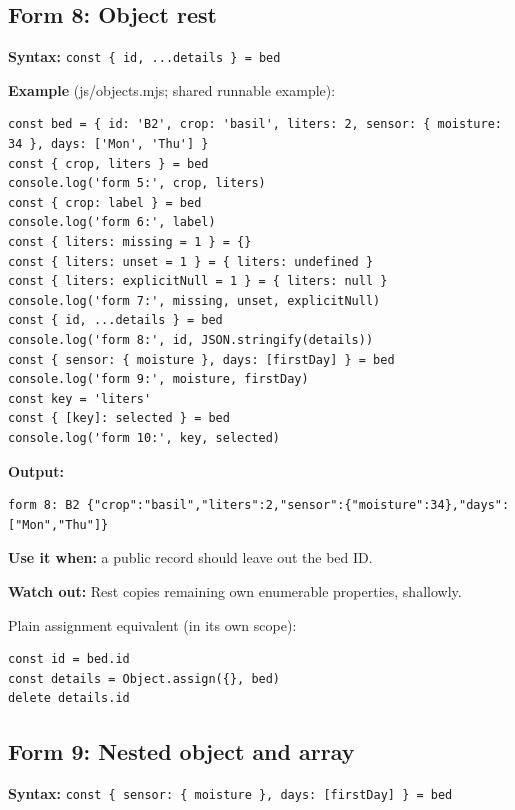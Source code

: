 \documentclass[
  10pt,
  a4paper,
]{article}
\begin{document}
\subsection{Form 8: Object rest}\label{form-8-object-rest}

\textbf{Syntax:}
\texttt{const \{ id,\allowbreak{} .\allowbreak{}.\allowbreak{}.\allowbreak{}details \} =\allowbreak{} bed}

\textbf{Example} (js/objects.mjs; shared runnable example):

\begin{lstlisting}
const bed = { id: 'B2', crop: 'basil', liters: 2, sensor: { moisture: 34 }, days: ['Mon', 'Thu'] }
const { crop, liters } = bed
console.log('form 5:', crop, liters)
const { crop: label } = bed
console.log('form 6:', label)
const { liters: missing = 1 } = {}
const { liters: unset = 1 } = { liters: undefined }
const { liters: explicitNull = 1 } = { liters: null }
console.log('form 7:', missing, unset, explicitNull)
const { id, ...details } = bed
console.log('form 8:', id, JSON.stringify(details))
const { sensor: { moisture }, days: [firstDay] } = bed
console.log('form 9:', moisture, firstDay)
const key = 'liters'
const { [key]: selected } = bed
console.log('form 10:', key, selected)
\end{lstlisting}

\textbf{Output:}

\begin{lstlisting}
form 8: B2 {"crop":"basil","liters":2,"sensor":{"moisture":34},"days":["Mon","Thu"]}
\end{lstlisting}

\textbf{Use it when:} a public record should leave out the bed ID.

\textbf{Watch out:} Rest copies remaining own enumerable properties,
shallowly.

Plain assignment equivalent (in its own scope):

\begin{lstlisting}
const id = bed.id
const details = Object.assign({}, bed)
delete details.id
\end{lstlisting}

\subsection{Form 9: Nested object and
array}\label{form-9-nested-object-and-array}

\textbf{Syntax:}
\texttt{const \{ sensor:\allowbreak{} \{ moisture \},\allowbreak{} days:\allowbreak{} [firstDay] \} =\allowbreak{} bed}
\end{document}
